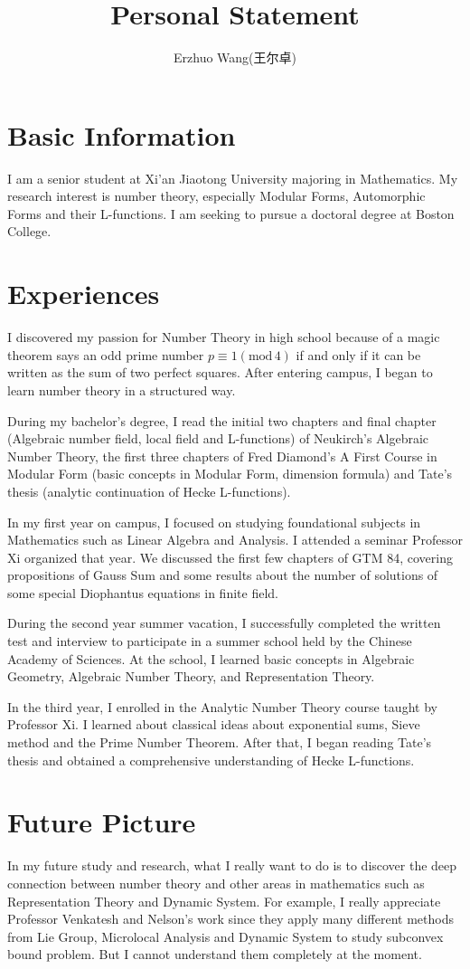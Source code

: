\documentclass[12pt]{article}
\title{Personal Statement}
\author{Erzhuo Wang(王尔卓)}
\date{}
\renewcommand{\mod}[1]{(\text{mod}\,#1)}
\theoremstyle{definition}
\begin{document}
\maketitle 
\section{Basic Information}
I am a senior student at Xi'an Jiaotong University majoring in Mathematics. 
My research interest is number theory, especially Modular Forms, Automorphic Forms and their L-functions. 
I am seeking to pursue a doctoral degree at Boston College.
\section{Experiences}
I discovered my passion for Number Theory in high school because of a magic theorem says an odd prime number 
$p \equiv 1\mod{4}$ if and only if it can be written as the sum of two perfect squares. 
After entering campus, I began to learn number theory in a structured way.

During my bachelor's degree,
I read the initial two chapters and final chapter (Algebraic number field, local field and L-functions) of Neukirch's Algebraic Number Theory, 
the first three chapters of Fred Diamond's A First Course in Modular Form (basic concepts in Modular Form, dimension formula)
and Tate's thesis (analytic continuation of Hecke L-functions).  

In my first year on campus, I focused on studying foundational subjects in Mathematics such as Linear Algebra and Analysis.
I attended a seminar Professor Xi organized that year. 
We discussed the first few chapters of GTM 84, covering propositions of Gauss Sum and some results about the number of 
solutions of some special
Diophantus equations in finite field. 

During the second year summer vacation, 
I successfully completed the written test and interview to participate in a summer school held by the Chinese Academy of Sciences. 
At the school, I learned basic concepts in Algebraic Geometry, Algebraic Number Theory, and Representation Theory. 

In the third year, I enrolled in the Analytic Number Theory course taught by Professor Xi. 
I learned about classical ideas about exponential sums, Sieve method and the Prime Number Theorem. 
After that, I began reading Tate's thesis and obtained a comprehensive understanding of Hecke L-functions. 
\section{Future Picture}
In my future study and research, what I really want to do is to 
discover the deep connection between number theory and other areas in mathematics such as Representation Theory 
and Dynamic System. 
For example, I really appreciate Professor Venkatesh and Nelson's work since they apply many different 
methods from Lie Group, Microlocal Analysis and Dynamic System to study subconvex bound problem. 
But I cannot understand them completely at the moment. 
\end{document}
